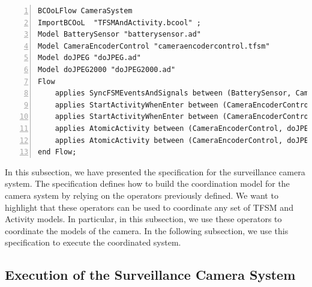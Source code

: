 \begin{lstlisting}[language=bflow,
caption={\bflow specification for the Surveillance Camera System},
label={lst:bflowcamerasystem}, 
basicstyle=\scriptsize\ttfamily, backgroundcolor=\color{LGrey}, numbers=left, xleftmargin=2pt]
BCOoLFlow CameraSystem
ImportBCOoL  "TFSMAndActivity.bcool" ;
Model BatterySensor "batterysensor.ad"
Model CameraEncoderControl "cameraencodercontrol.tfsm"
Model doJPEG "doJPEG.ad"
Model doJPEG2000 "doJPEG2000.ad"
Flow 
	applies SyncFSMEventsAndSignals between (BatterySensor, CameraEncoderControl);
	applies StartActivityWhenEnter between (CameraEncoderControl, doJPEG);
	applies StartActivityWhenEnter between (CameraEncoderControl, doJPEG2000);
	applies AtomicActivity between (CameraEncoderControl, doJPEG);		
	applies AtomicActivity between (CameraEncoderControl, doJPEG2000);		
end Flow;
\end{lstlisting}


In this subsection, we have presented the \bflow specification for the surveillance camera system. The \bflow specification defines how to build the coordination model for the camera system by relying on the operators previously defined. We want to highlight that these \bcool operators can be used to coordinate any set of TFSM and Activity models. In particular, in this subsection, we use these operators to coordinate the models of the camera. In the following subsection, we use this specification to execute the coordinated system.    

\subsection{Execution of the Surveillance Camera System}


